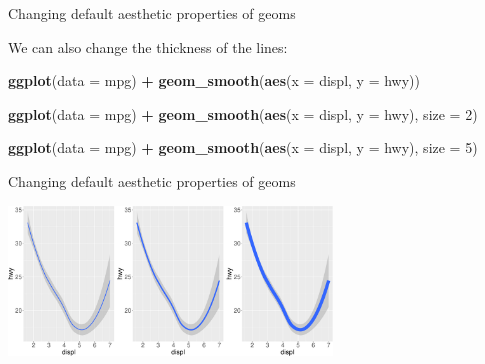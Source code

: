 \documentclass[ignorenonframetext,]{beamer}
\newenvironment{Shaded}{\begin{snugshade}}{\end{snugshade}}
\newcommand{\DataTypeTok}[1]{\textcolor[rgb]{0.13,0.29,0.53}{#1}}
\newcommand{\DecValTok}[1]{\textcolor[rgb]{0.00,0.00,0.81}{#1}}
\newcommand{\KeywordTok}[1]{\textcolor[rgb]{0.13,0.29,0.53}{\textbf{#1}}}
\newcommand{\NormalTok}[1]{#1}
\newcommand{\OperatorTok}[1]{\textcolor[rgb]{0.81,0.36,0.00}{\textbf{#1}}}
\newcommand{\StringTok}[1]{\textcolor[rgb]{0.31,0.60,0.02}{#1}}
\begin{document}
\begin{frame}[fragile]{Changing default aesthetic properties of geoms}
\protect\hypertarget{changing-default-aesthetic-properties-of-geoms-21}{}

We can also change the thickness of the lines:

\begin{Shaded}
\begin{Highlighting}[]
\KeywordTok{ggplot}\NormalTok{(}\DataTypeTok{data =}\NormalTok{ mpg) }\OperatorTok{+}\StringTok{ }
\StringTok{  }\KeywordTok{geom_smooth}\NormalTok{(}\KeywordTok{aes}\NormalTok{(}\DataTypeTok{x =}\NormalTok{ displ, }\DataTypeTok{y =}\NormalTok{ hwy))}

\KeywordTok{ggplot}\NormalTok{(}\DataTypeTok{data =}\NormalTok{ mpg) }\OperatorTok{+}\StringTok{ }
\StringTok{  }\KeywordTok{geom_smooth}\NormalTok{(}\KeywordTok{aes}\NormalTok{(}\DataTypeTok{x =}\NormalTok{ displ, }\DataTypeTok{y =}\NormalTok{ hwy), }\DataTypeTok{size =} \DecValTok{2}\NormalTok{)}

\KeywordTok{ggplot}\NormalTok{(}\DataTypeTok{data =}\NormalTok{ mpg) }\OperatorTok{+}\StringTok{ }
\StringTok{  }\KeywordTok{geom_smooth}\NormalTok{(}\KeywordTok{aes}\NormalTok{(}\DataTypeTok{x =}\NormalTok{ displ, }\DataTypeTok{y =}\NormalTok{ hwy), }\DataTypeTok{size =} \DecValTok{5}\NormalTok{)}
\end{Highlighting}
\end{Shaded}

\end{frame}

\begin{frame}{Changing default aesthetic properties of geoms}
\protect\hypertarget{changing-default-aesthetic-properties-of-geoms-22}{}

\begin{center}\includegraphics[height=150px]{data-visualization_files/figure-beamer/unnamed-chunk-55-1} \end{center}

\end{frame}
\end{document}
